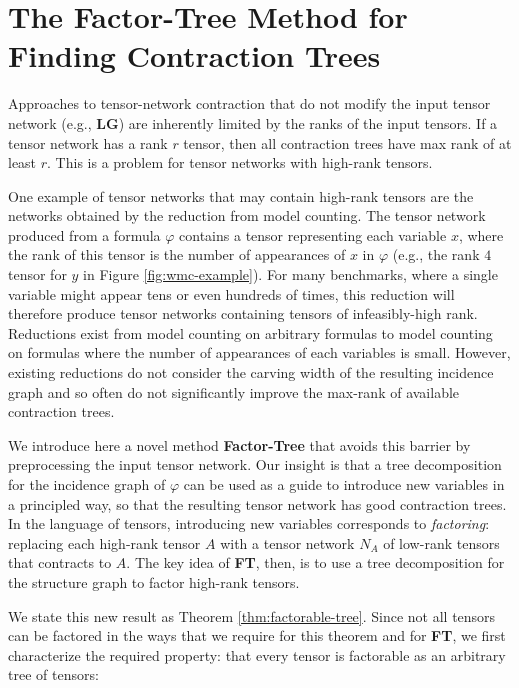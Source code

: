 \section{The Factor-Tree Method for Finding Contraction Trees}
\label{sec:tensors:preprocessing}
Approaches to tensor-network contraction that do not modify the input tensor network (e.g., \textbf{LG}) are inherently limited by the ranks of the input tensors. If a tensor network has a rank $r$ tensor, then all contraction trees have max rank of at least $r$. This is a problem for tensor networks with high-rank tensors. 

One example of tensor networks that may contain high-rank tensors are the networks obtained by the reduction from model counting. The tensor network produced from a formula $\varphi$ contains a tensor representing each variable $x$, where the rank of this tensor is the number of appearances of $x$ in $\varphi$ (e.g., the rank $4$ tensor for $y$ in Figure \ref{fig:wmc-example}). For many benchmarks, where a single variable might appear tens or even hundreds of times, this reduction will therefore produce tensor networks containing tensors of infeasibly-high rank. Reductions exist from model counting on arbitrary formulas to model counting on formulas where the number of appearances of each variables is small. However, existing reductions do not consider the carving width of the resulting incidence graph and so often do not significantly improve the max-rank of available contraction trees. 

We introduce here a novel method \textbf{Factor-Tree} that avoids this barrier by preprocessing the input tensor network. Our insight is that a tree decomposition for the incidence graph of $\varphi$ can be used as a guide to introduce new variables in a principled way, so that the resulting tensor network has good contraction trees. In the language of tensors, introducing new variables corresponds to \emph{factoring}: replacing each high-rank tensor $A$ with a tensor network $N_A$ of low-rank tensors that contracts to $A$. The key idea of \textbf{FT}, then, is to use a tree decomposition for the structure graph to factor high-rank tensors.

We state this new result as Theorem \ref{thm:factorable-tree}. Since not all tensors can be factored in the ways that we require for this theorem and for \textbf{FT}, we first characterize the required property: that every tensor is factorable as an arbitrary tree of tensors:


